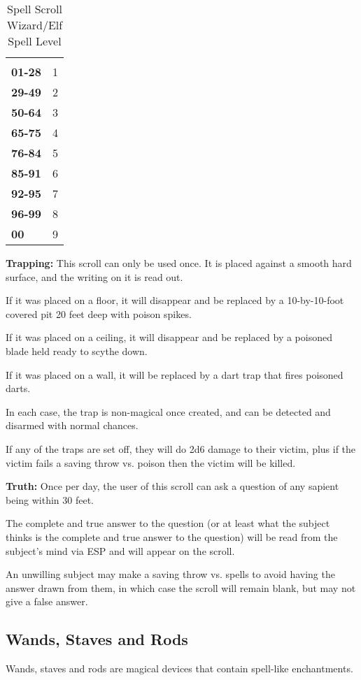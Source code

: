 \begin{multicols*}{2}
\begin {table}[H]
  \caption{Spell Scroll Wizard/Elf Spell Level}\label{tab:Spell Scroll Wizard/Elf Spell Level}
  \begin{tabularx}{\columnwidth}{>{\bfseries}YY}
	 & \\
	01-28 & 1\\
	29-49 & 2\\
	50-64 & 3\\
	65-75 & 4\\
	76-84 & 5\\
	85-91 & 6\\
	92-95 & 7\\
	96-99 & 8\\
	00 & 9
  \end {tabularx}
\end {table}

\textbf{Trapping:} This scroll can only be used once. It is placed against a smooth hard surface, and the writing on it is read out.

If it was placed on a floor, it will disappear and be replaced by a 10-by-10-foot covered pit 20 feet deep with poison spikes.

If it was placed on a ceiling, it will disappear and be replaced by a poisoned blade held ready to scythe down.

If it was placed on a wall, it will be replaced by a dart trap that fires poisoned darts.

In each case, the trap is non-magical once created, and can be detected and disarmed with normal chances.

If any of the traps are set off, they will do 2d6 damage to their victim, plus if the victim fails a saving throw vs. poison then the victim will be killed.

\textbf{Truth:} Once per day, the user of this scroll can ask a question of any sapient being within 30 feet.

The complete and true answer to the question (or at least what the subject thinks is the complete and true answer to the question) will be read from the subject’s mind via ESP and will appear on the scroll.

An unwilling subject may make a saving throw vs. spells to avoid having the answer drawn from them, in which case the scroll will remain blank, but may not give a false answer.

\subsection{Wands, Staves and Rods}
Wands, staves and rods are magical devices that contain spell-like enchantments.


\end{multicols*}

